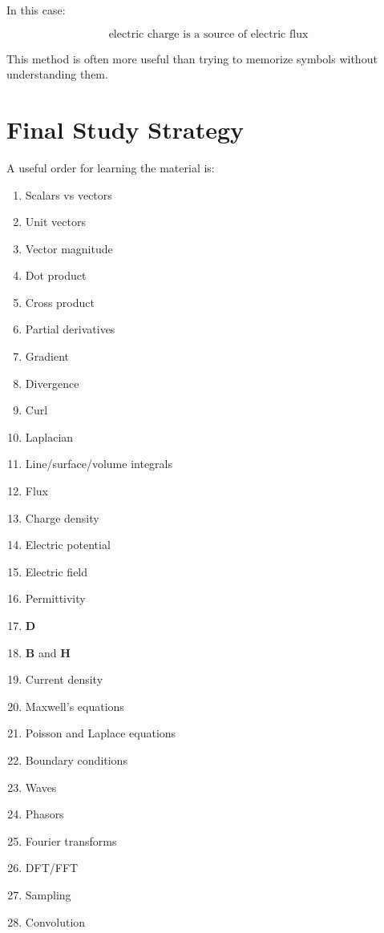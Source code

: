 \documentclass[11pt]{article}
\newcommand{\vect}[1]{\mathbf{#1}}
\begin{document}
In this case:

\[
\boxed{
\text{electric charge is a source of electric flux}
}
\]

This method is often more useful than trying to memorize symbols without understanding them.



\section{Final Study Strategy}

A useful order for learning the material is:

\begin{enumerate}
    \item Scalars vs vectors
    \item Unit vectors
    \item Vector magnitude
    \item Dot product
    \item Cross product
    \item Partial derivatives
    \item Gradient
    \item Divergence
    \item Curl
    \item Laplacian
    \item Line/surface/volume integrals
    \item Flux
    \item Charge density
    \item Electric potential
    \item Electric field
    \item Permittivity
    \item $\vect{D}$
    \item $\vect{B}$ and $\vect{H}$
    \item Current density
    \item Maxwell's equations
    \item Poisson and Laplace equations
    \item Boundary conditions
    \item Waves
    \item Phasors
    \item Fourier transforms
    \item DFT/FFT
    \item Sampling
    \item Convolution
\end{enumerate}
\end{document}
